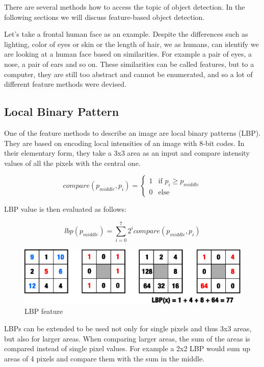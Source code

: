 There are several methods how to access the topic of object detection. In the following sections we will discuss feature-based object detection.

Let's take a frontal human face as an example. Despite the differences such as lighting, color of eyes or skin or the length of hair, we as humans, can identify we are looking at a human face based on similarities. For example a pair of eyes, a nose, a pair of ears and so on. These similarities can be called features, but to a computer, they are still too abstract and cannot be enumerated, and so a lot of different feature methods were devised.

\subsection{Local Binary Pattern}

One of the feature methods to describe an image are local binary patterns (LBP). They are based on encoding local intensities of an image with 8-bit codes. In their elementary form, they take a 3x3 area as an input and compare intensity values of all the pixels with the central one.

\[
 compare(p_{middle},p_{i}) =
  \begin{cases}
   1 & \text{if } p_{i} \geq p_{middle} \\
   0 & \text{else}
  \end{cases}
\]

LBP value is then evaluated as follows:

\begin{equation}
lbp(p_{middle})=\sum_{i=0}^{7} 2^{i}
compare(p_{middle},p_{i})
\end{equation}


\begin{center}
\begin{figure}[h]
	\centering\includegraphics[width=12cm]{fig/lbp.eps}
	\caption{LBP feature}
\end{figure}
\end{center}

LBPs can be extended to be used not only for single pixels and thus 3x3 areas, but also for larger areas. When comparing larger areas, the sum of the areas is compared instead of single pixel values. For example a 2x2 LBP would sum up areas of 4 pixels and compare them with the sum in the middle.

